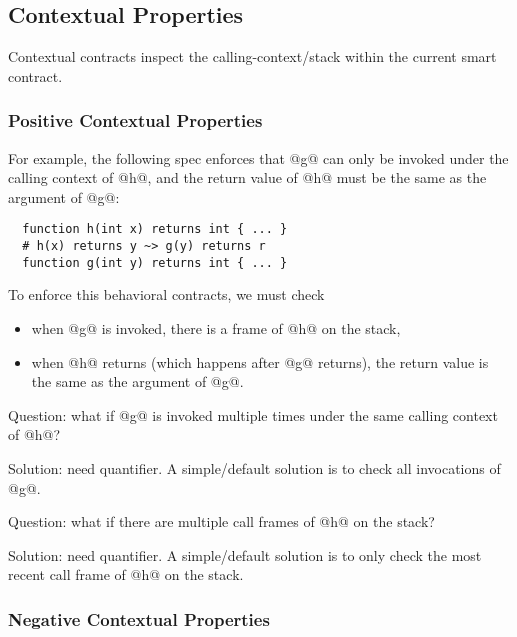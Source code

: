 \documentclass[acmsmall,review,anonymous]{acmart}\settopmatter{printfolios=true,printccs=false,printacmref=false}
\begin{document}


\subsection{Contextual Properties}

Contextual contracts inspect the calling-context/stack within the
current smart contract.


\subsubsection{Positive Contextual Properties}

For example, the following spec enforces that @g@ can only be invoked
under the calling context of @h@, and the return value of @h@ must be
the same as the argument of @g@:

\begin{lstlisting}
  function h(int x) returns int { ... }
  # h(x) returns y ~> g(y) returns r
  function g(int y) returns int { ... }
\end{lstlisting}

To enforce this behavioral contracts, we must check
\begin{itemize}
  \item when @g@ is invoked, there is a frame of @h@ on the stack,
  \item when @h@ returns (which happens after @g@ returns), the return value
  is the same as the argument of @g@.
\end{itemize}

Question: what if @g@ is invoked multiple times under the same calling context of
@h@?

Solution: need quantifier. A simple/default solution is to check all
invocations of @g@.

Question: what if there are multiple call frames of @h@ on the stack?

Solution: need quantifier. A simple/default solution is to only check
the most recent call frame of @h@ on the stack.

\subsubsection{Negative Contextual Properties}
\end{document}
